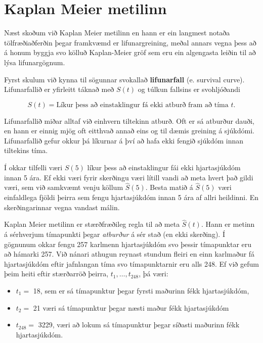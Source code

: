 \documentclass[
]{book}
\providecommand{\tightlist}{%
  \setlength{\itemsep}{0pt}\setlength{\parskip}{0pt}}
\begin{document}
\hypertarget{kaplan-meier-metilinn}{%
\section{Kaplan Meier metilinn}\label{kaplan-meier-metilinn}}

Næst skoðum við Kaplan Meier metilinn en hann er ein langmest notaða tölfræðiaðferðin þegar framkvæmd er lifunargreining, meðal annars vegna þess að á honum byggja svo kölluð Kaplan-Meier gröf sem eru ein algengasta leiðin til að lýsa lifunargögnum.

Fyrst skulum við kynna til sögunnar svokallað \textbf{lifunarfall} (e. survival curve). Lifunarfallið er yfirleitt táknað með \(S(t)\) og túlkun fallsins er svohljóðandi

\[ 
S(t) = \text{Líkur þess að einstaklingur fá ekki atburð fram að tíma $t$.}
\]

Lifunarfallið miðar alltaf við einhvern tiltekinn atburð. Oft er sá atburður dauði, en hann er einnig mjög oft eitthvað annað eins og til dæmis greining á sjúkdómi. Lifunarfallið gefur okkur þá líkurnar á því að hafa ekki fengið sjúkdóm innan tiltekins tíma.

Í okkar tilfelli væri \(S(5)\) líkur þess að einstaklingur fái ekki hjartasjúkdóm innan 5 ára. Ef ekki væri fyrir skerðingu væri lítill vandi að meta hvert það gildi væri, sem við samkvæmt venju köllum \(\hat S(5)\). Besta matið á \(\hat S(5)\) væri einfaldlega fjöldi þeirra sem fengu hjartasjúkdóm innan 5 ára af allri heildinni. En skerðingarinnar vegna vandast málin.

Kaplan Meier metilinn er stærðfræðileg regla til að meta \(\hat S(t)\). Hann er metinn á sérhverjum tímapunkti þegar \emph{atburður} á sér stað (en ekki skerðing). Í gögnunum okkar fengu 257 karlmenn hjartasjúkdóm svo þessir tímapunktar eru að hámarki 257. Við nánari athugun reynast stundum fleiri en einn karlmaður fá hjartasjúkdóm eftir jafnlangan tíma svo tímapunktarnir eru alls 248. Ef við gefum þeim heiti eftir stærðarröð þeirra, \(t_1, \ldots , t_{248}\), þá væri:

\begin{itemize}
\tightlist
\item
  \(t_1 =\) 18, sem er sá tímapunktur þegar fyrsti maðurinn fékk hjartasjúkdóm,
\item
  \(t_2 =\) 21 væri sá tímapunktur þegar næsti maður fékk hjartasjúkdóm
\item
  \(t_{248} =\) 3229, væri að lokum sá tímapunktur þegar síðasti maðurinn fékk hjartasjúkdóm.
\end{itemize}
\end{document}
